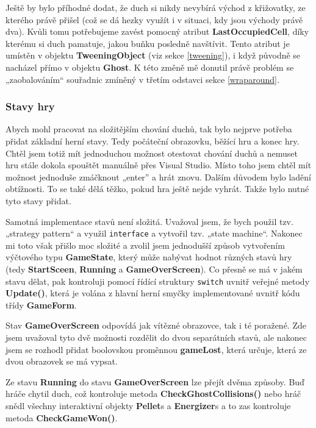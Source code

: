 \documentclass[a4]{article}
\begin{document}
Ještě by bylo příhodné dodat, že duch si nikdy nevybírá východ z křižovatky, ze kterého právě přišel (což se dá hezky využít i v situaci, kdy jsou východy právě dva). Kvůli tomu potřebujeme zavést pomocný atribut \textbf{LastOccupiedCell}, díky kterému si duch pamatuje, jakou buňku posledně navštívit. Tento atribut je umístěn v objektu \textbf{TweeningObject} (viz sekce \ref{tweening}), i když původně se nacházel přímo v objektu \textbf{Ghost}. K této změně mě donutil právě problém se „zaobalováním“ souřadnic zmíněný v třetím odstavci sekce \ref{wraparound}.

\subsubsection{Stavy hry} \label{gamestates}
Abych mohl pracovat na složitějším chování duchů, tak bylo nejprve potřeba přidat základní herní stavy. Tedy počáteční obrazovku, běžící hru a konec hry. Chtěl jsem totiž mít jednoduchou možnost otestovat chování duchů a nemuset hru stále dokola spouštět manuálně přes Visual Studio. Místo toho jsem chtěl mít možnost jednoduše zmáčknout „enter” a hrát znovu. Dalším důvodem bylo ladění obtížnosti. To se také dělá těžko, pokud hra ještě nejde vyhrát. Takže bylo nutné tyto stavy přidat.

Samotná implementace stavů není složitá. Uvažoval jsem, že bych použil tzv. „strategy pattern“ a využil \verb|interface| a vytvořil tzv. „state machine“. Nakonec mi toto však přišlo moc složité a zvolil jsem jednodušší způsob vytvořením výčtového typu \textbf{GameState}, který může nabývat hodnot různých stavů hry (tedy \textbf{StartSceen}, \textbf{Running} a \textbf{GameOverScreen}). Co přesně se má v jakém stavu dělat, pak kontroluji pomocí řídící struktury \verb|switch| uvnitř veřejné metody \textbf{Update()}, která je volána z hlavní herní smyčky implementované uvnitř kódu třídy \textbf{GameForm}. 

Stav \textbf{GameOverScreen} odpovídá jak vítězné obrazovce, tak i té poražené. Zde jsem uvažoval tyto dvě možnosti rozdělit do dvou separátních stavů, ale nakonec jsem se rozhodl přidat boolovskou proměnnou \textbf{gameLost}, která určuje, která ze dvou obrazovek se má vypsat.

Ze stavu \textbf{Running} do stavu \textbf{GameOverScreen} lze přejít dvěma způsoby. Buď hráče chytil duch, což kontroluje metoda \textbf{CheckGhostCollisions()} nebo hráč snědl všechny interaktivní objekty \textbf{Pellet}s a \textbf{Energizer}s a to zas kontroluje metoda \textbf{CheckGameWon()}.
\end{document}
